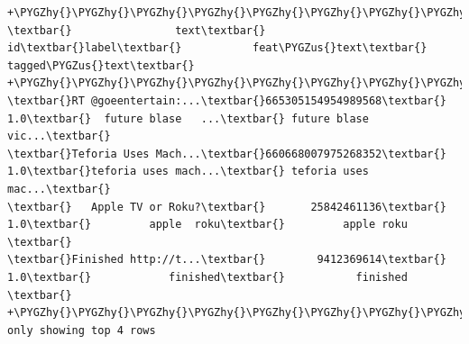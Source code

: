 \documentclass[letterpaper,11pt,english]{sphinxmanual}
\def\PYGZus{\char`\_}
\def\PYGZhy{\char`\-}
\begin{document}
\begin{Verbatim}[commandchars=\\\{\}]
+\PYGZhy{}\PYGZhy{}\PYGZhy{}\PYGZhy{}\PYGZhy{}\PYGZhy{}\PYGZhy{}\PYGZhy{}\PYGZhy{}\PYGZhy{}\PYGZhy{}\PYGZhy{}\PYGZhy{}\PYGZhy{}\PYGZhy{}\PYGZhy{}\PYGZhy{}\PYGZhy{}\PYGZhy{}\PYGZhy{}+\PYGZhy{}\PYGZhy{}\PYGZhy{}\PYGZhy{}\PYGZhy{}\PYGZhy{}\PYGZhy{}\PYGZhy{}\PYGZhy{}\PYGZhy{}\PYGZhy{}\PYGZhy{}\PYGZhy{}\PYGZhy{}\PYGZhy{}\PYGZhy{}\PYGZhy{}\PYGZhy{}+\PYGZhy{}\PYGZhy{}\PYGZhy{}\PYGZhy{}\PYGZhy{}+\PYGZhy{}\PYGZhy{}\PYGZhy{}\PYGZhy{}\PYGZhy{}\PYGZhy{}\PYGZhy{}\PYGZhy{}\PYGZhy{}\PYGZhy{}\PYGZhy{}\PYGZhy{}\PYGZhy{}\PYGZhy{}\PYGZhy{}\PYGZhy{}\PYGZhy{}\PYGZhy{}\PYGZhy{}\PYGZhy{}+\PYGZhy{}\PYGZhy{}\PYGZhy{}\PYGZhy{}\PYGZhy{}\PYGZhy{}\PYGZhy{}\PYGZhy{}\PYGZhy{}\PYGZhy{}\PYGZhy{}\PYGZhy{}\PYGZhy{}\PYGZhy{}\PYGZhy{}\PYGZhy{}\PYGZhy{}\PYGZhy{}\PYGZhy{}\PYGZhy{}+
\textbar{}                text\textbar{}                id\textbar{}label\textbar{}           feat\PYGZus{}text\textbar{}         tagged\PYGZus{}text\textbar{}
+\PYGZhy{}\PYGZhy{}\PYGZhy{}\PYGZhy{}\PYGZhy{}\PYGZhy{}\PYGZhy{}\PYGZhy{}\PYGZhy{}\PYGZhy{}\PYGZhy{}\PYGZhy{}\PYGZhy{}\PYGZhy{}\PYGZhy{}\PYGZhy{}\PYGZhy{}\PYGZhy{}\PYGZhy{}\PYGZhy{}+\PYGZhy{}\PYGZhy{}\PYGZhy{}\PYGZhy{}\PYGZhy{}\PYGZhy{}\PYGZhy{}\PYGZhy{}\PYGZhy{}\PYGZhy{}\PYGZhy{}\PYGZhy{}\PYGZhy{}\PYGZhy{}\PYGZhy{}\PYGZhy{}\PYGZhy{}\PYGZhy{}+\PYGZhy{}\PYGZhy{}\PYGZhy{}\PYGZhy{}\PYGZhy{}+\PYGZhy{}\PYGZhy{}\PYGZhy{}\PYGZhy{}\PYGZhy{}\PYGZhy{}\PYGZhy{}\PYGZhy{}\PYGZhy{}\PYGZhy{}\PYGZhy{}\PYGZhy{}\PYGZhy{}\PYGZhy{}\PYGZhy{}\PYGZhy{}\PYGZhy{}\PYGZhy{}\PYGZhy{}\PYGZhy{}+\PYGZhy{}\PYGZhy{}\PYGZhy{}\PYGZhy{}\PYGZhy{}\PYGZhy{}\PYGZhy{}\PYGZhy{}\PYGZhy{}\PYGZhy{}\PYGZhy{}\PYGZhy{}\PYGZhy{}\PYGZhy{}\PYGZhy{}\PYGZhy{}\PYGZhy{}\PYGZhy{}\PYGZhy{}\PYGZhy{}+
\textbar{}RT @goeentertain:...\textbar{}665305154954989568\textbar{}  1.0\textbar{}  future blase   ...\textbar{} future blase vic...\textbar{}
\textbar{}Teforia Uses Mach...\textbar{}660668007975268352\textbar{}  1.0\textbar{}teforia uses mach...\textbar{} teforia uses mac...\textbar{}
\textbar{}   Apple TV or Roku?\textbar{}       25842461136\textbar{}  1.0\textbar{}         apple  roku\textbar{}         apple roku \textbar{}
\textbar{}Finished http://t...\textbar{}        9412369614\textbar{}  1.0\textbar{}            finished\textbar{}           finished \textbar{}
+\PYGZhy{}\PYGZhy{}\PYGZhy{}\PYGZhy{}\PYGZhy{}\PYGZhy{}\PYGZhy{}\PYGZhy{}\PYGZhy{}\PYGZhy{}\PYGZhy{}\PYGZhy{}\PYGZhy{}\PYGZhy{}\PYGZhy{}\PYGZhy{}\PYGZhy{}\PYGZhy{}\PYGZhy{}\PYGZhy{}+\PYGZhy{}\PYGZhy{}\PYGZhy{}\PYGZhy{}\PYGZhy{}\PYGZhy{}\PYGZhy{}\PYGZhy{}\PYGZhy{}\PYGZhy{}\PYGZhy{}\PYGZhy{}\PYGZhy{}\PYGZhy{}\PYGZhy{}\PYGZhy{}\PYGZhy{}\PYGZhy{}+\PYGZhy{}\PYGZhy{}\PYGZhy{}\PYGZhy{}\PYGZhy{}+\PYGZhy{}\PYGZhy{}\PYGZhy{}\PYGZhy{}\PYGZhy{}\PYGZhy{}\PYGZhy{}\PYGZhy{}\PYGZhy{}\PYGZhy{}\PYGZhy{}\PYGZhy{}\PYGZhy{}\PYGZhy{}\PYGZhy{}\PYGZhy{}\PYGZhy{}\PYGZhy{}\PYGZhy{}\PYGZhy{}+\PYGZhy{}\PYGZhy{}\PYGZhy{}\PYGZhy{}\PYGZhy{}\PYGZhy{}\PYGZhy{}\PYGZhy{}\PYGZhy{}\PYGZhy{}\PYGZhy{}\PYGZhy{}\PYGZhy{}\PYGZhy{}\PYGZhy{}\PYGZhy{}\PYGZhy{}\PYGZhy{}\PYGZhy{}\PYGZhy{}+
only showing top 4 rows
\end{Verbatim}
\end{document}
